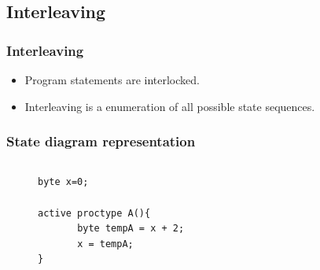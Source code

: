 \documentclass{beamer}
\begin{document}
\subsection{Interleaving}

\begin{frame}
  \frametitle{Interleaving}
  \begin{itemize}
  \item Program statements are interlocked.
  \item Interleaving is a enumeration of all possible state sequences.
  \end{itemize}
\end{frame}

\begin{frame}[fragile]
  \frametitle{State diagram representation}
  \begin{columns}

    \begin{column}{.5\textwidth}
      \begin{figure}
        \centering
\begin{lstlisting}
byte x=0;

active proctype A(){
       byte tempA = x + 2;
       x = tempA;
}
\end{lstlisting}
      \end{figure}
    \end{column}

    \begin{column}{.5\textwidth}
      
      \begin{figure}
        \centering
      \end{figure} 
    \end{column}    
  \end{columns}

\end{frame}
\end{document}
